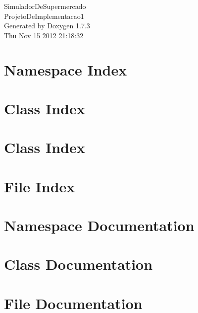 \documentclass[a4paper]{book}
\begin{document}
\hypersetup{pageanchor=false}
\begin{titlepage}
\vspace*{7cm}
\begin{center}
{\Large SimuladorDeSupermercado \\[1ex]\large ProjetoDeImplementacao1 }\\
\vspace*{1cm}
{\large Generated by Doxygen 1.7.3}\\
\vspace*{0.5cm}
{\small Thu Nov 15 2012 21:18:32}\\
\end{center}
\end{titlepage}
\clearemptydoublepage
{}
\tableofcontents
\clearemptydoublepage
{}
\hypersetup{pageanchor=true}
\chapter{Namespace Index}

\chapter{Class Index}

\chapter{Class Index}

\chapter{File Index}

\chapter{Namespace Documentation}

\chapter{Class Documentation}







\chapter{File Documentation}















\printindex
\end{document}
